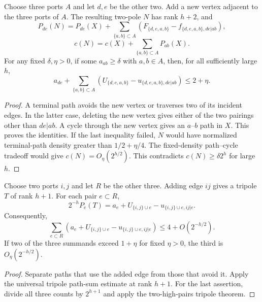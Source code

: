 \begin{proposition}
\label{prop:five-pole-three-cap}
Choose three ports $A$ and let $d,e$ be the other two.
Add a new vertex adjacent to the three ports of $A$.
The resulting two-pole $N$ has rank $h+2$, and
\[
 P_{de}(N)=P_{de}(X)+\sum_{\{a,b\}\subset A}
 \left(F_{\{d,e,a,b\}}-f_{\{d,e,a,b\},de|ab}\right),
\]
\[
 c(N)=c(X)+\sum_{\{a,b\}\subset A}P_{ab}(X).
\]
For any fixed $\delta,\eta>0$, if some $a_{ab}\ge\delta$ with $a,b\in A$, then, for all sufficiently large $h$,
\[
 a_{de}+\sum_{\{a,b\}\subset A}
 \left(U_{\{d,e,a,b\}}-u_{\{d,e,a,b\},de|ab}\right)\le2+\eta.
\]
\end{proposition}
\begin{proof}
A terminal path avoids the new vertex or traverses two of its incident edges.
In the latter case, deleting the new vertex gives either of the two pairings other than $de|ab$.
A cycle through the new vertex gives an $a$--$b$ path in $X$.
This proves the identities.
If the last inequality failed, $N$ would have normalized terminal-path density greater than $1/2+\eta/4$.
The fixed-density path--cycle tradeoff would give $c(N)=O_\eta(2^{h/2})$.
This contradicts $c(N)\ge\delta2^h$ for large $h$.
\end{proof}

\begin{proposition}
\label{prop:five-pole-added-edge}
Choose two ports $i,j$ and let $R$ be the other three.
Adding edge $ij$ gives a tripole $T$ of rank $h+1$.
For each pair $e\subset R$,
\[
 2^{-h}P_e(T)=a_e+U_{\{i,j\}\cup e}-u_{\{i,j\}\cup e,ij|e}.
\]
Consequently,
\[
 \sum_{e\subset R}\left(a_e+U_{\{i,j\}\cup e}-u_{\{i,j\}\cup e,ij|e}\right)
 \le4+O(2^{-h/2}).
\]
If two of the three summands exceed $1+\eta$ for fixed $\eta>0$, the third is $O_\eta(2^{-h/2})$.
\end{proposition}
\begin{proof}
Separate paths that use the added edge from those that avoid it.
Apply the universal tripole path-sum estimate at rank $h+1$.
For the last assertion, divide all three counts by $2^{h+1}$ and apply the two-high-pairs tripole theorem.
\end{proof}


